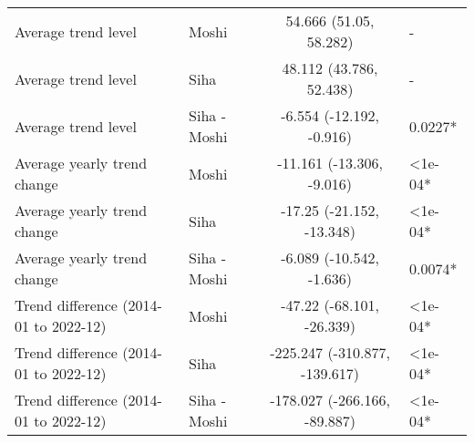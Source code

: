 \begin{longtable}{l|lcl}
\midrule\addlinespace[2.5pt]
\multicolumn{4}{l}{Vector-borne Infections} \\ 
\midrule\addlinespace[2.5pt]
Average trend level & Moshi & 54.666 (51.05, 58.282) & - \\ 
Average trend level & Siha & 48.112 (43.786, 52.438) & - \\ 
Average trend level & Siha - Moshi & -6.554 (-12.192, -0.916) & 0.0227* \\ 
Average yearly trend change & Moshi & -11.161 (-13.306, -9.016) & <1e-04* \\ 
Average yearly trend change & Siha & -17.25 (-21.152, -13.348) & <1e-04* \\ 
Average yearly trend change & Siha - Moshi & -6.089 (-10.542, -1.636) & 0.0074* \\ 
Trend difference (2014-01 to 2022-12) & Moshi & -47.22 (-68.101, -26.339) & <1e-04* \\ 
Trend difference (2014-01 to 2022-12) & Siha & -225.247 (-310.877, -139.617) & <1e-04* \\ 
Trend difference (2014-01 to 2022-12) & Siha - Moshi & -178.027 (-266.166, -89.887) & <1e-04* \\ 
\bottomrule
\end{longtable}

